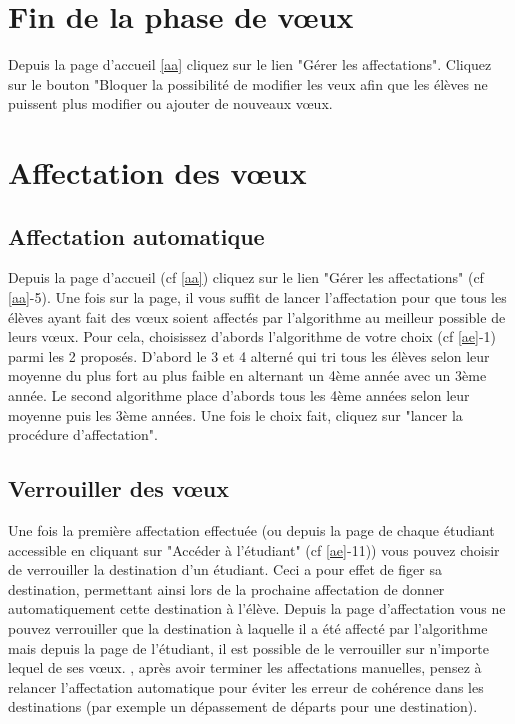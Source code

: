 \section{Fin de la phase de vœux} 

Depuis la page d'accueil \ref{aa} cliquez sur le lien "Gérer les affectations". Cliquez sur le bouton "Bloquer la possibilité de modifier les veux afin que les élèves ne puissent plus modifier ou ajouter de nouveaux vœux.

\section{Affectation des vœux}
\label{afv}

\subsection{Affectation automatique}
Depuis la page d'accueil (cf \ref{aa}) cliquez sur le lien "Gérer les affectations" (cf \ref{aa}-5). Une fois sur la page, il vous suffit de lancer l'affectation pour que tous les élèves ayant fait des vœux soient affectés par l'algorithme au meilleur possible de leurs vœux. Pour cela, choisissez d'abords l'algorithme de votre choix (cf \ref{ae}-1) parmi les 2 proposés. D'abord le 3 et 4 alterné qui tri tous les élèves selon leur moyenne du plus fort au plus faible en alternant un 4ème année avec un 3ème année. Le second algorithme place d'abords tous les 4ème années selon leur moyenne puis les 3ème années. Une fois le choix fait, cliquez sur "lancer la procédure d'affectation".

\subsection{Verrouiller des vœux}
Une fois la première affectation effectuée (ou depuis la page de chaque étudiant accessible en cliquant sur "Accéder à l'étudiant" (cf \ref{ae}-11)) vous pouvez choisir de verrouiller la destination d'un étudiant. Ceci a pour effet de figer sa destination, permettant ainsi lors de la prochaine affectation de donner automatiquement cette destination à l'élève. Depuis la page d'affectation vous ne pouvez verrouiller que la destination à laquelle il a été affecté par l'algorithme mais depuis la page de l'étudiant, il est possible de le verrouiller sur n'importe lequel de ses vœux.
\att, après avoir terminer les affectations manuelles, pensez à relancer l'affectation automatique pour éviter les erreur de cohérence dans les destinations (par exemple un dépassement de départs pour une destination).

